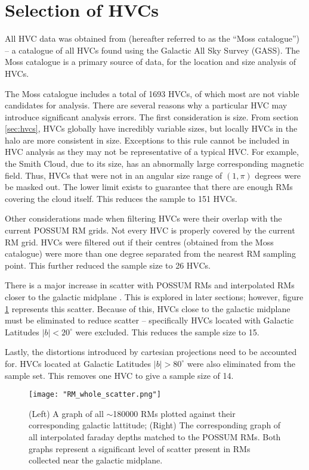 \section{Selection of HVCs}
\label{sec:hvc_sel}

All HVC data was obtained from \cite{ID3} (hereafter referred to as the “Moss catalogue”) – a catalogue of all HVCs found using the Galactic All Sky Survey (GASS). The Moss catalogue is a primary source of data, for the location and size analysis of HVCs.


The Moss catalogue includes a total of 1693 HVCs, of which most are not viable candidates for analysis. There are several reasons why a particular HVC may introduce significant analysis errors. The first consideration is size. From section \ref{sec:hvcs}, HVCs globally have incredibly variable sizes, but locally HVCs in the halo are more consistent in size. Exceptions to this rule cannot be included in HVC analysis as they may not be representative of a typical HVC. For example, the Smith Cloud, due to its size, has an abnormally large corresponding magnetic field. Thus, HVCs that were not in an angular size range of $(1,\pi)$ degrees were be masked out. The lower limit exists to guarantee that there are enough RMs covering the cloud itself. This reduces the sample to 151 HVCs.


Other considerations made when filtering HVCs were their overlap with the current POSSUM RM grids. Not every HVC is properly covered by the current RM grid. HVCs were filtered out if their centres (obtained from the Moss catalogue) were more than one degree separated from the nearest RM sampling point. This further reduced the sample size to 26 HVCs.


There is a major increase in scatter with POSSUM RMs and interpolated RMs closer to the galactic midplane \citep{ID21}. This is explored in later sections; however, figure \ref{fig:rm_scatter} represents this scatter. Because of this, HVCs close to the galactic midplane must be eliminated to reduce scatter – specifically HVCs located with Galactic Latitudes $|b|<20^{\circ}$ were excluded. This reduces the sample size to 15.


Lastly, the distortions introduced by cartesian projections need to be accounted for. HVCs located at Galactic Latitudes $|b|>80^{\circ}$ were also eliminated from the sample set. This removes one HVC to give a sample size of 14.

\begin{figure}
    \texttt{[image: "RM\_whole\_scatter.png"]}
    \centering
    \caption{(Left) A graph of all $\sim$180000 RMs plotted against their corresponding galactic lattitude; (Right) The corresponding graph of all interpolated faraday depths matched to the POSSUM RMs. Both graphs represent a significant level of scatter present in RMs collected near the galactic midplane.}
    \label{fig:rm_scatter}
\end{figure}

